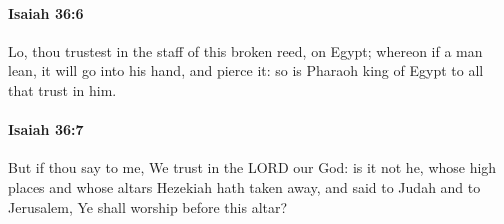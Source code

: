 		\paragraph{Isaiah 36:6} %
			\label{ISAIAH-36-6}

			Lo, thou trustest in the staff of this broken reed, on Egypt; whereon if a man lean, it will go into his hand, and pierce it: so is Pharaoh king of Egypt to all that trust in him.


		\paragraph{Isaiah 36:7} %
			\label{ISAIAH-36-7}

			But if thou say to me, We trust in the LORD our God: is it not he, whose high places and whose altars Hezekiah hath taken away, and said to Judah and to Jerusalem, Ye shall worship before this altar?


